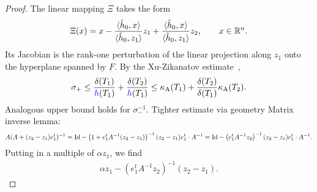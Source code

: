 \documentclass[10pt,a4paper]{article}
\newcommand{\mwl}[1]{{\color{red}#1}}
\begin{document}
\begin{proof}
    \color{blue}
    \color{red}
    The linear mapping $\Xi$ takes the form 
    \begin{align*}
        \Xi(x) 
        = 
        x 
        - \frac{ \langle \hat h_0, x \rangle }{ \langle \hat h_0, z_1 \rangle } z_1
        + \frac{ \langle \hat h_0, x \rangle }{ \langle \hat h_0, z_1 \rangle } z_2
        ,
        \qquad 
        x \in {\mathbb R}^{n}
        .
    \end{align*}
    Its Jacobian is the rank-one perturbation of the linear projection along $z_1$ onto the hyperplane spanned by $F$. 
    By the Xu-Zikanatov estimate~\cite{xu2003some},
    \begin{align*}
        \sigma_{+} 
        \leq 
        \frac{ \diam(T_1) }{ \height(T_1) }
        +
        \frac{ \diam(T_2) }{ \height(T_1) }
        \leq 
        \aspectratio(T_1) + \frac{ \diam(T_2) }{ \diam(T_1) } \aspectratio(T_2)
        .
    \end{align*}
    Analogous upper bound holds for $\sigma^{-1}_{-}$.
    \color{Mulberry}
    \mwl{Tighter estimate via geometry}
    Matrix inverse lemma:
    \begin{align*}
        A ( A + (z_2-z_1) e_1^t )^{-1}
        =
        {\rm Id}
        - 
        \left( 1 + e_1^{t} A^{-1} (z_2-z_1) \right)^{-1}
        (z_2-z_1) e_1^t \cdot A^{-1}
        =
        {\rm Id}
        - 
        \left( e_1^{t} A^{-1} z_2 \right)^{-1}
        (z_2-z_1) e_1^t \cdot A^{-1}
        .
    \end{align*}
    Putting in a multiple of $\alpha z_1$, we find 
    \begin{align*}
        \alpha z_1
        -
        \left( e_1^{t} A^{-1} z_2 \right)^{-1}
        (z_2-z_1) 
        .
    \end{align*}


\end{proof}
\end{document}
